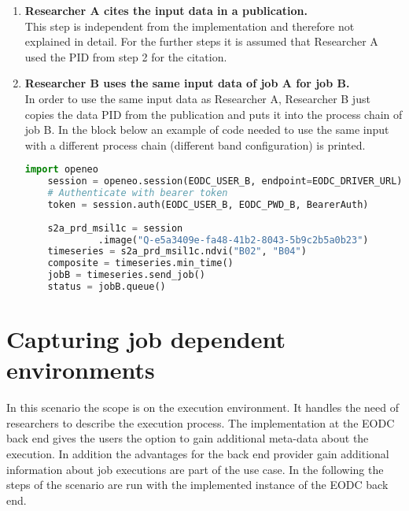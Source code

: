 \documentclass[draft,final]{vutinfth} %
\begin{document}
\begin{enumerate}
	\item \textbf{Researcher A cites the input data in a publication.} \\
	This step is independent from the implementation and therefore not explained in detail. For the further steps it is assumed that Researcher A used the PID from step 2 for the citation.   
	
	\item \textbf{Researcher B uses the same input data of job A for job B.} \\
	In order to use the same input data as Researcher A, Researcher B just copies the data PID from the publication and puts it into the process chain of job B. In the block below an example of code needed to use the same input with a different process chain (different band configuration) is printed.   
	\begin{lstlisting}[frame=single, language=Python]
	import openeo
	session = openeo.session(EODC_USER_B, endpoint=EODC_DRIVER_URL)
	# Authenticate with bearer token
	token = session.auth(EODC_USER_B, EODC_PWD_B, BearerAuth)
	
	s2a_prd_msil1c = session
		     .image("Q-e5a3409e-fa48-41b2-8043-5b9c2b5a0b23")
	timeseries = s2a_prd_msil1c.ndvi("B02", "B04")
	composite = timeseries.min_time()
	jobB = timeseries.send_job()
	status = jobB.queue()
	\end{lstlisting}
	
\end{enumerate}

\section{Capturing job dependent environments}\label{Evaluation:Use Case2}
In this scenario the scope is on the execution environment. It handles the need of researchers to describe the execution process. The implementation at the EODC back end gives the users the option to gain additional meta-data about the execution. In addition the advantages for the back end provider gain additional information about job executions are part of the use case. In the following the steps of the scenario are run with the implemented instance of the EODC back end.    
\end{document}
